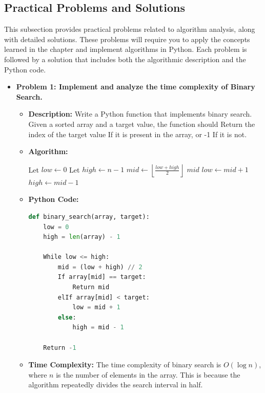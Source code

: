 \documentclass[12pt]{book} %
\begin{document}
\subsection{Practical Problems and Solutions}
This subsection provides practical problems related to algorithm analysis, along with detailed solutions. These problems will require you to apply the concepts learned in the chapter and implement algorithms in Python. Each problem is followed by a solution that includes both the algorithmic description and the Python code.

\begin{itemize}
    \item \textbf{Problem 1: Implement and analyze the time complexity of Binary Search.}
    \begin{itemize}
        \item \textbf{Description:} Write a Python function that implements binary search. Given a sorted array and a target value, the function should Return the index of the target value If it is present in the array, or -1 If it is not.
        \item \textbf{Algorithm:}
        \begin{algorithm}
        \caption{Binary Search}
        \begin{algorithmic}
            \State Let $low \leftarrow 0$
            \State Let $high \leftarrow n-1$
                \State $mid \leftarrow \left\lfloor \frac{low + high}{2} \right\rfloor$
                    \Return $mid$
                    \State $low \leftarrow mid + 1$
                \Else
                    \State $high \leftarrow mid - 1$
                \EndIf
            \EndWhile
        \end{algorithmic}
        \end{algorithm}
        \item \textbf{Python Code:}
        \FloatBarrier
        \begin{lstlisting}[language=Python]
def binary_search(array, target):
    low = 0
    high = len(array) - 1

    While low <= high:
        mid = (low + high) // 2
        If array[mid] == target:
            Return mid
        elIf array[mid] < target:
            low = mid + 1
        else:
            high = mid - 1

    Return -1
        \end{lstlisting}
        \FloatBarrier
        \item \textbf{Time Complexity:} The time complexity of binary search is $O(\log n)$, where $n$ is the number of elements in the array. This is because the algorithm repeatedly divides the search interval in half.
    \end{itemize}


\end{itemize}
\end{document}
